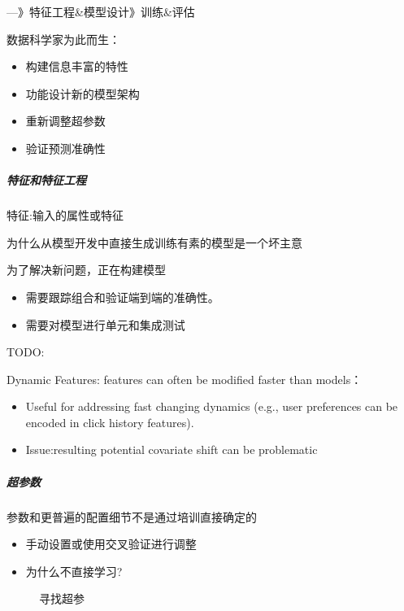 \documentclass[letterpaper,11pt,english]{sphinxmanual}
\begin{document}
—》特征工程\&模型设计\sphinxhyphen{}》训练\&评估

数据科学家为此而生：
\begin{itemize}
\item {} 
构建信息丰富的特性

\item {} 
功能设计新的模型架构

\item {} 
重新调整超参数

\item {} 
验证预测准确性

\end{itemize}


\subparagraph{特征和特征工程}
\label{\detokenize{chapter_project/Model Process:id5}}
特征:输入的属性或特征

为什么从模型开发中直接生成训练有素的模型是一个坏主意

为了解决新问题，正在构建模型
\begin{itemize}
\item {} 
需要跟踪组合和验证端到端的准确性。

\item {} 
需要对模型进行单元和集成测试

\end{itemize}

TODO:

Dynamic Features: features can often be modified faster than models：
\begin{itemize}
\item {} 
Useful for addressing fast changing dynamics (e.g., user preferences
can be encoded in click history features).

\item {} 
Issue:resulting potential covariate shift can be problematic

\end{itemize}


\subparagraph{超参数}
\label{\detokenize{chapter_project/Model Process:id6}}
参数和更普遍的配置细节不是通过培训直接确定的
\begin{itemize}
\item {} 
手动设置或使用交叉验证进行调整

\item {} 
为什么不直接学习?

\end{itemize}

\begin{figure}[H]
\centering
\capstart

\noindent{}
\caption{寻找超参}\label{\detokenize{chapter_project/Model Process:id13}}\end{figure}
\end{document}
